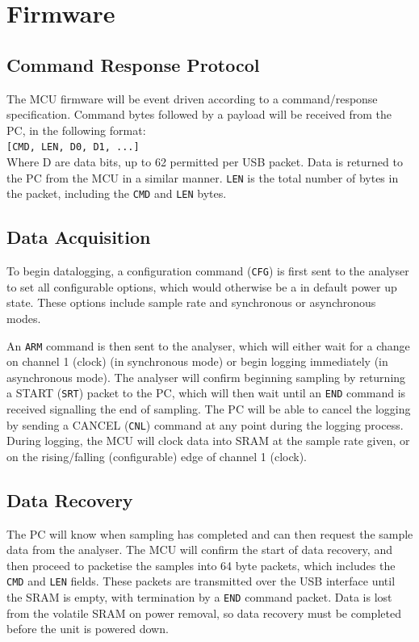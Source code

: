 \documentclass[11pt]{article}
\begin{document}
\section{Firmware}
\subsection{Command Response Protocol}
    The MCU firmware will be event driven according to a command/response
    specification. Command bytes followed by a payload will be received from the
    PC, in the following format: \\

    \texttt{[CMD, LEN, D0, D1,  ...]} \\

    Where D are data bits, up to 62 permitted per USB packet. Data is returned
    to the PC from the MCU in a similar manner. \texttt{LEN} is the total number
    of bytes in the packet, including the \texttt{CMD} and \texttt{LEN} bytes.

\subsection{Data Acquisition}
    To begin datalogging, a configuration command (\texttt{CFG}) 
    is first sent to the analyser
    to set all configurable options, which would otherwise be a in default power
    up state. These options include sample rate and synchronous or asynchronous
    modes.

    An \texttt{ARM} command is then sent to the analyser, which will either wait
    for a change on channel 1 (clock) (in synchronous mode) or begin logging
    immediately (in asynchronous mode). The analyser will confirm beginning
    sampling by returning a START (\texttt{SRT}) packet to the PC, which 
    will then
    wait until an \texttt{END} command is received signalling the end of
    sampling. The PC will be able to cancel the logging by sending a CANCEL
    (\texttt{CNL}) command at any point during the logging process. During
    logging, the MCU will clock data into SRAM at the sample rate given, or on
    the rising/falling (configurable) edge of channel 1 (clock).

\subsection{Data Recovery}
    The PC will know when sampling has completed and can then request the sample
    data from the analyser. The MCU will confirm the start of data recovery, and
    then proceed to packetise the samples into 64 byte packets, which includes
    the \texttt{CMD} and \texttt{LEN} fields. These packets are transmitted over
    the USB interface until the SRAM is empty, with termination by a
    \texttt{END} command packet. Data is lost from the volatile SRAM on power
    removal, so data recovery must be completed before the unit is powered down.
\end{document}
